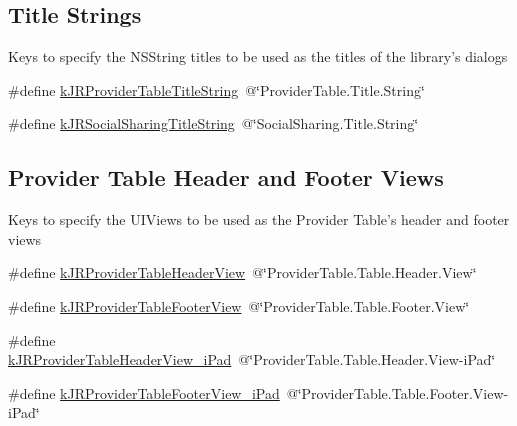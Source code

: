 \subsection*{Title Strings}
\label{_amgrp57383e7526d006c80c9394d9945c0a3b}
 Keys to specify the NSString titles to be used as the titles of the library's dialogs \begin{DoxyCompactItemize}
\item 
\#define \hyperlink{group__custom_interface_gaf728e45125be9ca6fa515a39a77e7ce7}{kJRProviderTableTitleString}~@\char`\"{}ProviderTable.Title.String\char`\"{}
\item 
\#define \hyperlink{group__custom_interface_ga8fb89469dc5225bf0ea4d1faca6aa2ab}{kJRSocialSharingTitleString}~@\char`\"{}SocialSharing.Title.String\char`\"{}
\end{DoxyCompactItemize}
\subsection*{Provider Table Header and Footer Views}
\label{_amgrp7070181e423f8bdc938527d6916a62cf}
 Keys to specify the UIViews to be used as the Provider Table's header and footer views \begin{DoxyCompactItemize}
\item 
\#define \hyperlink{group__custom_interface_ga1a0f39bfdb880fdd0b8b39cbec492b6f}{kJRProviderTableHeaderView}~@\char`\"{}ProviderTable.Table.Header.View\char`\"{}
\item 
\#define \hyperlink{group__custom_interface_ga2b5c9162dd7701a552147ae1607a3b4d}{kJRProviderTableFooterView}~@\char`\"{}ProviderTable.Table.Footer.View\char`\"{}
\item 
\#define \hyperlink{group__custom_interface_gafaf90a1aa537b105ebc2409ceacc652f}{kJRProviderTableHeaderView\_\-iPad}~@\char`\"{}ProviderTable.Table.Header.View-\/iPad\char`\"{}
\item 
\#define \hyperlink{group__custom_interface_gaa23a63165d46433e2ec24ba44ef771da}{kJRProviderTableFooterView\_\-iPad}~@\char`\"{}ProviderTable.Table.Footer.View-\/iPad\char`\"{}
\end{DoxyCompactItemize}
